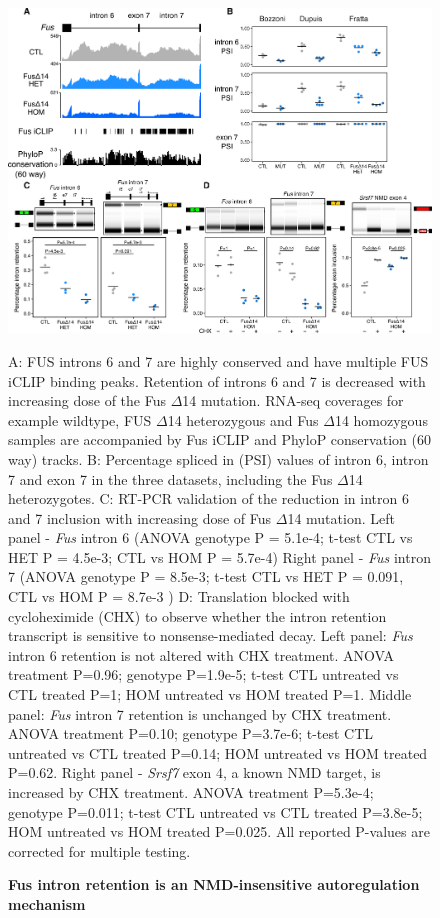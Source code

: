 \begin{figure}[h!]
	\centering
	\includegraphics[width=\textwidth]{Figures/06_fus_meta/Fus_autoregulation.png}
	\caption{\textbf{Fus intron retention is an NMD-insensitive autoregulation mechanism } }
		A: FUS introns 6 and 7 are highly conserved and have multiple FUS iCLIP binding peaks. 
		Retention of introns 6 and 7 is decreased with increasing dose of the Fus $\Delta$14 mutation. 
		RNA-seq coverages for example wildtype, FUS $\Delta$14 heterozygous and Fus $\Delta$14 homozygous samples are accompanied by Fus iCLIP and PhyloP conservation (60 way) tracks.
		B: Percentage spliced in (PSI) values of intron 6, intron 7 and exon 7 in the three datasets, including the Fus $\Delta$14 heterozygotes.
		C: RT-PCR validation of the reduction in intron 6 and 7 inclusion with increasing dose of Fus $\Delta$14 mutation. 
		Left panel - \textit{Fus} intron 6 (ANOVA genotype P = 5.1e-4; t-test CTL vs HET P = 4.5e-3; CTL vs HOM P = 5.7e-4)
		Right panel - \textit{Fus} intron 7 (ANOVA genotype P = 8.5e-3; t-test CTL vs HET P = 0.091, CTL vs HOM P = 8.7e-3 )
		D:	Translation blocked with cycloheximide (CHX) to observe whether the intron retention transcript is sensitive to nonsense-mediated decay. 
		Left panel: \textit{Fus} intron 6 retention is not altered with CHX treatment. ANOVA treatment P=0.96; genotype P=1.9e-5; t-test CTL untreated vs CTL treated P=1; HOM untreated vs HOM treated P=1.
		Middle panel: \textit{Fus} intron 7 retention is unchanged by CHX treatment. ANOVA treatment P=0.10; genotype P=3.7e-6; t-test CTL untreated vs CTL treated P=0.14; HOM untreated vs HOM treated P=0.62.
		Right panel - \textit{Srsf7} exon 4, a known NMD target, is increased by CHX treatment. ANOVA treatment P=5.3e-4; genotype P=0.011; t-test CTL untreated vs CTL treated P=3.8e-5; HOM untreated vs HOM treated P=0.025.
		All reported P-values are corrected for multiple testing.
	\label{fig:fus_autoregulation}
\end{figure}


